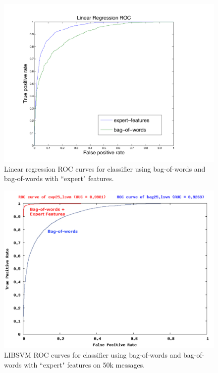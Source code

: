 \documentclass[preprint]{acm_proc_article-sp}
\begin{document}
\begin{figure}[h]
    \centering
    \includegraphics[width=\linewidth]{figures/linear-roc.pdf}
    \caption{Linear regression ROC curves for classifier using bag-of-words and bag-of-words with ``expert" features.}
    \label{fig:roclin}
\end{figure}

\begin{figure}[h]
    \centering
    \includegraphics[width=\linewidth]{figures/roc-25.pdf}
    \caption{LIBSVM ROC curves for classifier using bag-of-words and bag-of-words with ``expert" features on 50k messages.}
    \label{fig:roc-25}
\end{figure}
\end{document}
